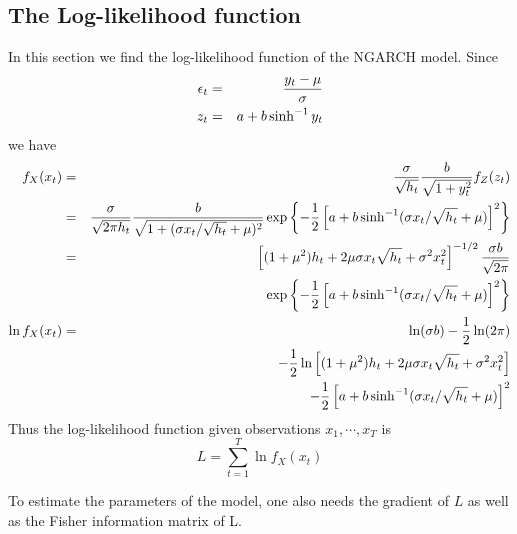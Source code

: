 \documentclass{book}
\begin{document}
\subsection{The Log-likelihood function}
In this section we find the log-likelihood function of the NGARCH
model. Since
\begin{eqnarray*}
  \epsilon_t &=& {y_t - \mu \over \sigma} \\
  z_t &=& a + b \sinh^{-1} y_t
\end{eqnarray*}
we have
\begin{eqnarray*}
  f_X(x_t) &=& {\sigma \over \sqrt{h_t}} {b \over \sqrt{1 + y_t^2}}
  f_Z(z_t)\\
  &=& {\sigma \over \sqrt{2\pi h_t}}
  {b \over \sqrt{1 + (\sigma x_t / \sqrt{h_t} + \mu)^2}}
  \exp\left\{-{1 \over 2}
    \left[a + b\sinh^{-1}(\sigma x_t / \sqrt{h_t} + \mu)\right]^2
  \right\} \\
  &=& \left[
    (1 + \mu^2)h_t + 2\mu\sigma x_t \sqrt{h_t} + \sigma^2 x_t^2
  \right]^{-1/2}
  {\sigma b \over \sqrt{2\pi}} \\
  &&
  \exp\left\{-{1 \over 2}
    \left[a + b\sinh^{-1}(\sigma x_t / \sqrt{h_t} + \mu)\right]^2
  \right\} \\
  \ln f_X(x_t) &=& \ln(\sigma b) - {1 \over 2} \ln(2\pi) \\
  && -{1 \over 2} \ln\left[
    (1 + \mu^2)h_t + 2\mu\sigma x_t \sqrt{h_t} + \sigma^2 x_t^2
  \right] \\
  && -{1 \over 2}\left[a + b\sinh^{-1}(\sigma x_t / \sqrt{h_t} + \mu)\right]^2
\end{eqnarray*}
Thus the log-likelihood function given observations $x_1, \cdots, x_T$
is
\begin{equation}
  L = \sum_{t=1}^T \ln f_X(x_t)
\end{equation}

To estimate the parameters of the model, one also needs the gradient
of $L$ as well as the Fisher information matrix of L.
\end{document}
